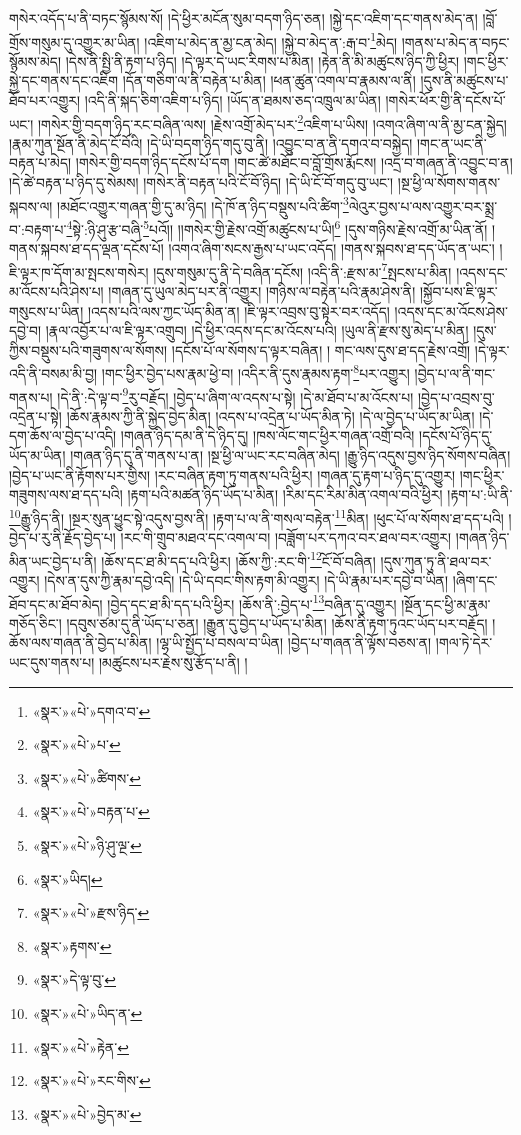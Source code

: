གསེར་འདོད་པ་ནི་བཏང་སྙོམས་སོ། །དེ་ཕྱིར་མངོན་སུམ་བདག་ཉིད་ཅན། །སྐྱེ་དང་འཇིག་དང་གནས་མེད་ན། །བློ་གྲོས་གསུམ་དུ་འགྱུར་མ་ཡིན། །འཇིག་པ་མེད་ན་མྱ་ངན་མེད། །སྐྱེ་བ་མེད་ན་:རྒ་བ་\footnote{«སྣར་»«པེ་»དགའ་བ་}མེད། །གནས་པ་མེད་ན་བཏང་སྙོམས་མེད། །དེས་ནི་སྤྱི་ནི་རྟག་པ་ཉིད། །དེ་ལྟར་དེ་ཡང་རིགས་པ་མིན། །རྟེན་ནི་མི་མཚུངས་ཉིད་ཀྱི་ཕྱིར། །གང་ཕྱིར་སྐྱེ་དང་གནས་དང་འཇིག །དོན་གཅིག་ལ་ནི་བརྟེན་པ་མིན། །ཕན་ཚུན་འགལ་བ་རྣམས་ལ་ནི། །དུས་ནི་མཚུངས་པ་ཐོབ་པར་འགྱུར། །འདི་ནི་སྐད་ཅིག་འཇིག་པ་ཉིད། །ཡོད་ན་ཐམས་ཅད་འཁྲུལ་མ་ཡིན། །གསེར་ཕོར་གྱི་ནི་དངོས་པོ་ཡང་། །གསེར་གྱི་བདག་ཉིད་རང་བཞིན་ལས། །རྗེས་འགྲོ་མེད་པར་\footnote{«སྣར་»«པེ་»པ་}འཇིག་པ་ཡིས། །འགའ་ཞིག་ལ་ནི་མྱ་ངན་སྐྱེད། །རྣམ་ཀུན་སྔོན་ནི་མེད་ངོ་བོའི། །དེ་ཡི་བདག་ཉིད་གདུ་བུ་ནི། །འབྱུང་བ་ན་ནི་དགའ་བ་བསྐྱེད། །གང་ན་ཡང་ནི་བརྟན་པ་མེད། །གསེར་གྱི་བདག་ཉིད་དངོས་པོ་དག །གང་ཚེ་མཐོང་བ་བློ་གྲོས་རྨོངས། །འདྲ་བ་གཞན་ནི་འབྱུང་བ་ན། །དེ་ཚེ་བརྟན་པ་ཉིད་དུ་སེམས། །གསེར་ནི་བརྟན་པའི་ངོ་བོ་ཉིད། །དེ་ཡི་ངོ་བོ་གདུ་བུ་ཡང་། །སྔ་ཕྱི་ལ་སོགས་གནས་སྐབས་ལ། །མཐོང་འགྱུར་གཞན་གྱི་དུ་མ་ཉིད། །དེ་ཁོ་ན་ཉིད་བསྡུས་པའི་ཚིག་\footnote{«སྣར་»«པེ་»ཚིགས་}ལེའུར་བྱས་པ་ལས་འགྱུར་བར་སྨྲ་བ་:བརྟག་པ་\footnote{«སྣར་»«པེ་»བརྟན་པ་}སྟེ་:ཉི་ཤུ་རྩ་བཞི་\footnote{«སྣར་»«པེ་»ཉི་ཤུ་ལྔ་}པའོ།། །།གསེར་གྱི་རྗེས་འགྲོ་མཚུངས་པ་ཡི།\footnote{«སྣར་»ཡིད།} །དུས་གཉིས་རྗེས་འགྲོ་མ་ཡིན་ནོ། །གནས་སྐབས་ཐ་དད་ལྡན་དངོས་པོ། །འགའ་ཞིག་སངས་རྒྱས་པ་ཡང་འདོད། །གནས་སྐབས་ཐ་དད་ཡོད་ན་ཡང་། །ཇི་ལྟར་ཁ་དོག་མ་སྤངས་གསེར། །དུས་གསུམ་དུ་ནི་དེ་བཞིན་དངོས། །འདི་ནི་:རྫས་མ་\footnote{«སྣར་»«པེ་»རྫས་ཉིད་}སྤངས་པ་མིན། །འདས་དང་མ་འོངས་པའི་ཤེས་པ། །གཞན་དུ་ཡུལ་མེད་པར་ནི་འགྱུར། །གཉིས་ལ་བརྟེན་པའི་རྣམ་ཤེས་ནི། །སྐྱོབ་པས་ཇི་ལྟར་གསུངས་པ་ཡིན། །འདས་པའི་ལས་ཀྱང་ཡོད་མིན་ན། །ཇི་ལྟར་འབྲས་བུ་སྟེར་བར་འདོད། །འདས་དང་མ་འོངས་ཤེས་དབྱེ་བ། །རྣལ་འབྱོར་པ་ལ་ཇི་ལྟར་འགྲུབ། །དེ་ཕྱིར་འདས་དང་མ་འོངས་པའི། །ཡུལ་ནི་རྫས་སུ་མེད་པ་མིན། །དུས་ཀྱིས་བསྡུས་པའི་གཟུགས་ལ་སོགས། །དངོས་པོ་ལ་སོགས་ད་ལྟར་བཞིན། །
གང་ལས་དུས་ཐ་དད་རྗེས་འགྲོ། །དེ་ལྟར་འདི་ནི་བསམ་མི་བྱ། །གང་ཕྱིར་བྱེད་པས་རྣམ་ཕྱེ་བ། །འདིར་ནི་དུས་རྣམས་རྟག་\footnote{«སྣར་»རྟགས་}པར་འགྱུར། །བྱེད་པ་ལ་ནི་གང་གནས་པ། །དེ་ནི་:དེ་ལྟ་བ་\footnote{«སྣར་»དེ་ལྟ་བུ་}རུ་བརྗོད། །བྱེད་པ་ཞིག་ལ་འདས་པ་སྟེ། །དེ་མ་ཐོབ་པ་མ་འོངས་པ། །བྱེད་པ་འབྲས་བུ་འདྲེན་པ་སྟེ། །ཆོས་རྣམས་ཀྱི་ནི་སྐྱེད་བྱེད་མིན། །འདས་པ་འདྲེན་པ་ཡོད་མིན་ཏེ། །དེ་ལ་བྱེད་པ་ཡོད་མ་ཡིན། །དེ་དག་ཆོས་ལ་བྱེད་པ་འདི། །གཞན་ཉིད་དམ་ནི་དེ་ཉིད་དུ། །ཁས་ལོང་གང་ཕྱིར་གཞན་འགྲོ་བའི། །དངོས་པོ་ཉིད་དུ་ཡོད་མ་ཡིན། །གཞན་ཉིད་དུ་ནི་གནས་པ་ན། །སྔ་ཕྱི་ལ་ཡང་རང་བཞིན་མེད། །རྒྱུ་ཉིད་འདུས་བྱས་ཉིད་སོགས་བཞིན། །བྱེད་པ་ཡང་ནི་རྟོགས་པར་གྱིས། །རང་བཞིན་རྟག་ཏུ་གནས་པའི་ཕྱིར། །གཞན་དུ་རྟག་པ་ཉིད་དུ་འགྱུར། །གང་ཕྱིར་གཟུགས་ལས་ཐ་དད་པའི། །རྟག་པའི་མཚན་ཉིད་ཡོད་པ་མིན། །རིམ་དང་རིམ་མིན་འགལ་བའི་ཕྱིར། །རྟག་པ་:ཡི་ནི་\footnote{«སྣར་»«པེ་»ཡིད་ན་}རྒྱུ་ཉིད་ནི། །སྔར་སུན་ཕྱུང་སྟེ་འདུས་བྱས་ནི། །རྟག་པ་ལ་ནི་གསལ་བརྟེན་\footnote{«སྣར་»«པེ་»རྟེན་}མིན། །ཕུང་པོ་ལ་སོགས་ཐ་དད་པའི། །བྱེད་པ་རུ་ནི་རྗོད་བྱེད་པ། །རང་གི་གྲུབ་མཐའ་དང་འགལ་བ། །བཟློག་པར་དཀའ་བར་ཐལ་བར་འགྱུར། །གཞན་ཉིད་མིན་ཡང་བྱེད་པ་ནི། །ཆོས་དང་ཐ་མི་དད་པའི་ཕྱིར། །ཆོས་ཀྱི་:རང་གི་\footnote{«སྣར་»«པེ་»རང་གིས་}ངོ་བོ་བཞིན། །དུས་ཀུན་ཏུ་ནི་ཐལ་བར་འགྱུར། །དེས་ན་དུས་ཀྱི་རྣམ་དབྱེ་འདི། །དེ་ཡི་དབང་གིས་རྟག་མི་འགྱུར། །དེ་ཡི་རྣམ་པར་དབྱེ་བ་ཡིན། །ཞིག་དང་ཐོབ་དང་མ་ཐོབ་མེད། །བྱེད་དང་ཐ་མི་དད་པའི་ཕྱིར། །ཆོས་ནི་:བྱེད་པ་\footnote{«སྣར་»«པེ་»བྱེད་མ་}བཞིན་དུ་འགྱུར། །སྔོན་དང་ཕྱི་མ་རྣམ་གཅོད་ཅིང་། །དབུས་ཙམ་དུ་ནི་ཡོད་པ་ཅན། །རྒྱུན་དུ་བྱེད་པ་ཡོད་པ་མིན། །ཆོས་ནི་རྟག་ཏུའང་ཡོད་པར་བརྗོད། །ཆོས་ལས་གཞན་ནི་བྱེད་པ་མིན། །ལྷ་ཡི་སྤྱོད་པ་བསལ་བ་ཡིན། །བྱེད་པ་གཞན་ནི་ལྟོས་བཅས་ན། །གལ་ཏེ་དེར་ཡང་དུས་གནས་པ། །མཚུངས་པར་རྗེས་སུ་རྩོད་པ་ནི། །
